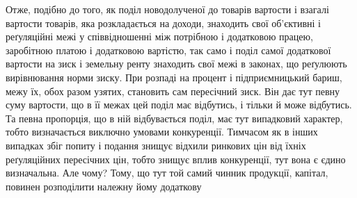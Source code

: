 Отже, подібно до того, як поділ новодолученої до товарів вартости і взагалі
вартости товарів, яка розкладається на доходи, знаходить свої об’єктивні
і реґуляційні межі у співвідношенні між потрібною і додатковою працею, заробітною
платою і додатковою вартістю, так само і поділ самої додаткової вартости
на зиск і земельну ренту знаходить свої межі в законах, що реґулюють
вирівнювання норми зиску. При розпаді на процент і підприємницький
бариш, межу їх, обох разом узятих, становить сам пересічний зиск. Він
дає тут певну суму вартости, що в її межах цей поділ має відбутись, і тільки
й може відбутись. Та певна пропорція, що в ній відбувається поділ, має
тут випадковий характер, тобто визначається виключно умовами конкуренції.
Тимчасом як в інших випадках збіг попиту і подання знищує відхили ринкових
цін від їхніх реґуляційних пересічних цін, тобто знищує вплив конкуренції,
тут вона є єдино визначальна. Але чому? Тому, що тут той
самий чинник продукції, капітал, повинен розподілити належну йому додаткову
\parbreak{}  %
